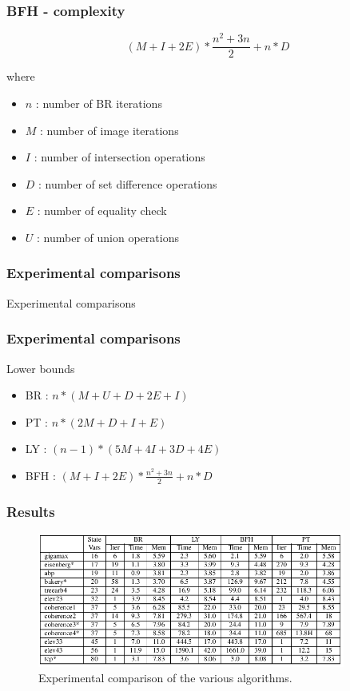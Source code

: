 \documentclass[11pt,handout]{beamer}
\begin{document}
\begin{frame}
  \frametitle{BFH - complexity}
  \[
    (M + I + 2E) * \frac{n^2 + 3n}{2} + n * D
  \]

  where

  \begin{itemize}
  \item $n$ : number of BR iterations
  \item $M$ : number of image iterations
  \item $I$ : number of intersection operations
  \item $D$ : number of set difference operations
  \item $E$ : number of equality check
  \item $U$ : number of union operations
  \end{itemize}
\end{frame}

\begin{frame}
  \frametitle{Experimental comparisons}
  Experimental comparisons
\end{frame}

\begin{frame}
  \frametitle{Experimental comparisons}

  Lower bounds
  
  \begin{itemize}
  \item BR : $n*(M + U + D + 2E + I)$
  \item PT : $n * (2M + D + I + E)$
  \item LY : $(n-1)*(5M + 4I  + 3D + 4E)$
  \item BFH : $(M + I + 2E) * \frac{n^2 + 3n}{2} + n * D$
  \end{itemize}
\end{frame}

\begin{frame}[fragile]
  \frametitle{Results}
  \begin{figure}[t]
    \centering
    \includegraphics[width=0.9\textwidth]{figures/experimental_comparison}
    \caption{Experimental comparison of the various algorithms.}
    \label{fig:experimental-comparison}
  \end{figure}
\end{frame}
\end{document}
